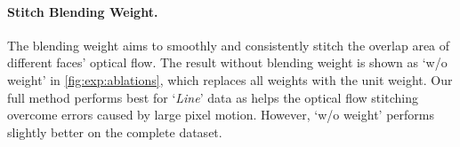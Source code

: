 \paragraph{Stitch Blending Weight.}
The blending weight aims to smoothly and consistently stitch the overlap area of different faces' optical flow.
The result without blending weight is shown as `w/o weight' in \cref{fig:exp:ablations}, which replaces all weights with the unit weight.
Our full method performs best for `\emph{Line}' data as helps the optical flow stitching overcome errors caused by large pixel motion.
However, `w/o weight' performs slightly better on the complete dataset.



